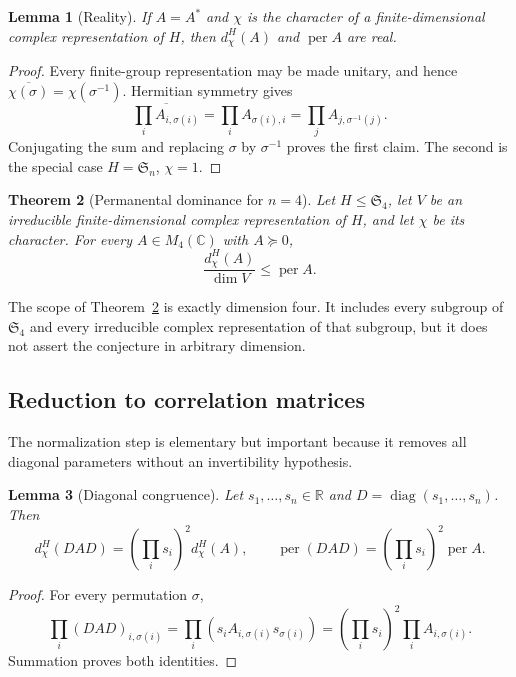 \documentclass[11pt]{article}
\newtheorem{theorem}{Theorem}[section]
\newtheorem{lemma}[theorem]{Lemma}
\theoremstyle{definition}
\newcommand{\CC}{\mathbb C}
\newcommand{\RR}{\mathbb R}
\newcommand{\Sn}{\mathfrak S}
\newcommand{\per}{\operatorname{per}}
\newcommand{\diag}{\operatorname{diag}}
\newcommand{\psd}{\succeq 0}
\begin{document}
\begin{lemma}[Reality]\label{lem:reality}
If $A=A^*$ and $\chi$ is the character of a finite-dimensional complex
representation of $H$, then $d_\chi^H(A)$ and $\per A$ are real.
\end{lemma}

\begin{proof}
Every finite-group representation may be made unitary, and hence
$\overline{\chi(\sigma)}=\chi(\sigma^{-1})$.  Hermitian symmetry gives
\[
 \overline{\prod_i A_{i,\sigma(i)}}
 =\prod_i A_{\sigma(i),i}
 =\prod_j A_{j,\sigma^{-1}(j)}.
\]
Conjugating the sum and replacing $\sigma$ by $\sigma^{-1}$ proves the first
claim.  The second is the special case $H=\Sn_n$, $\chi=1$.
\end{proof}

\begin{theorem}[Permanental dominance for $n=4$]\label{thm:main}
Let $H\leq\Sn_4$, let $V$ be an irreducible finite-dimensional complex
representation of $H$, and let $\chi$ be its character.  For every
$A\in M_4(\CC)$ with $A\psd$,
\begin{equation}\label{eq:main}
  \frac{d_\chi^H(A)}{\dim V}\leq \per A.
\end{equation}
\end{theorem}

The scope of Theorem~\ref{thm:main} is exactly dimension four.  It includes
every subgroup of $\Sn_4$ and every irreducible complex representation of
that subgroup, but it does not assert the conjecture in arbitrary dimension.

\subsection{Reduction to correlation matrices}

The normalization step is elementary but important because it removes all
diagonal parameters without an invertibility hypothesis.

\begin{lemma}[Diagonal congruence]\label{lem:scaling}
Let $s_1,\dots,s_n\in\RR$ and $D=\diag(s_1,\dots,s_n)$.  Then
\[
 d_\chi^H(DAD)=\left(\prod_i s_i\right)^2d_\chi^H(A),
 \qquad
 \per(DAD)=\left(\prod_i s_i\right)^2\per A.
\]
\end{lemma}

\begin{proof}
For every permutation $\sigma$,
\[
 \prod_i(DAD)_{i,\sigma(i)}
 =\prod_i(s_iA_{i,\sigma(i)}s_{\sigma(i)})
 =\left(\prod_i s_i\right)^2\prod_iA_{i,\sigma(i)}.
\]
Summation proves both identities.
\end{proof}
\end{document}
